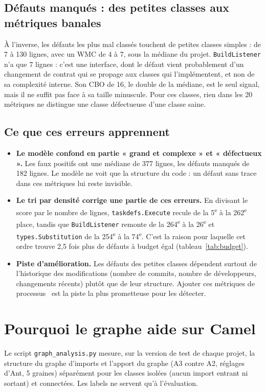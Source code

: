 \documentclass[11pt,a4paper,openany]{report}
\newcommand{\code}[1]{\texttt{\small #1}}
\begin{document}
\subsection{Défauts manqués : des petites classes aux métriques banales}
À l'inverse, les défauts les plus mal classés touchent de petites classes simples : de 7 à 130 lignes, avec un WMC
de 4 à 7, sous la médiane du projet. \code{BuildListener} n'a que 7 lignes : c'est une interface, dont le défaut
vient probablement d'un changement de contrat qui se propage aux classes qui l'implémentent, et non de sa
complexité interne. Son CBO de 16, le double de la médiane, est le seul signal, mais il ne suffit pas face à sa
taille minuscule. Pour ces classes, rien dans les 20 métriques ne distingue une classe défectueuse d'une classe
saine.

\subsection{Ce que ces erreurs apprennent}
\begin{itemize}
  \item \textbf{Le modèle confond en partie « grand et complexe » et « défectueux ».} Les faux positifs ont une
        médiane de 377 lignes, les défauts manqués de 182 lignes. Le modèle ne
        voit que la structure du code : un défaut sans trace dans ces métriques lui reste invisible.
  \item \textbf{Le tri par densité corrige une partie de ces erreurs.} En divisant le score par le nombre de lignes,
        \code{taskdefs.Execute} recule de la 5\textsuperscript{e} à la 262\textsuperscript{e} place, tandis que
        \code{BuildListener} remonte de la 264\textsuperscript{e} à la 26\textsuperscript{e} et \code{types.Substitution}
        de la 254\textsuperscript{e} à la 74\textsuperscript{e}. C'est la raison pour laquelle cet ordre trouve 2,5 fois
        plus de défauts à budget égal (tableau~\ref{tab:budget}).
  \item \textbf{Piste d'amélioration.} Les défauts des petites classes dépendent surtout de l'historique des
        modifications (nombre de commits, nombre de développeurs, changements récents) plutôt que de leur structure.
        Ajouter ces métriques de processus~\cite{moser2008} est la piste la plus prometteuse pour les détecter.
\end{itemize}


\section{Pourquoi le graphe aide sur Camel}
\label{sec:graph}
Le script \code{graph\_analysis.py} mesure, sur la version de test de chaque projet, la structure du graphe d'imports et
l'apport du graphe (A3 contre A2, réglages d'Ant, 5 graines) séparément pour les classes isolées (aucun import entrant
ni sortant) et connectées. Les labels ne servent qu'à l'évaluation.
\end{document}
